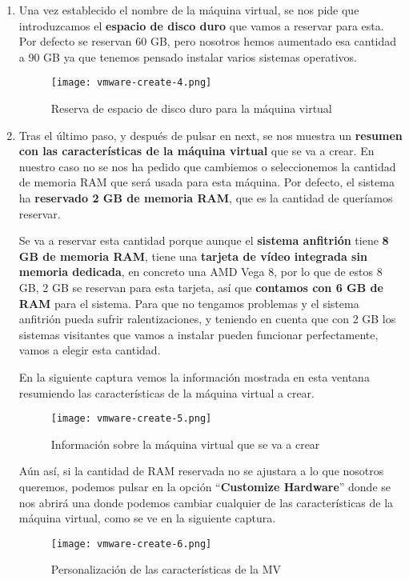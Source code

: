 \begin{enumerate}
    \item Una vez establecido el nombre de la máquina virtual, se nos pide que introduzcamos el \textbf{espacio de disco duro} que vamos a reservar para esta. Por defecto se reservan 60 GB, pero nosotros hemos aumentado esa cantidad a 90 GB ya que tenemos pensado instalar varios sistemas operativos.

    \begin{figure}[H]
        \centering
        \texttt{[image: vmware-create-4.png]}
        \caption{Reserva de espacio de disco duro para la máquina virtual}
    \end{figure}

    \item Tras el último paso, y después de pulsar en next, se nos muestra un \textbf{resumen con las características de la máquina virtual} que se va a crear. En nuestro caso no se nos ha pedido que cambiemos o seleccionemos la cantidad de memoria RAM que será usada para esta máquina. Por defecto, el sistema ha \textbf{reservado 2 GB de memoria RAM}, que es la cantidad de queríamos reservar.

    Se va a reservar esta cantidad porque aunque el \textbf{sistema anfitrión} tiene \textbf{8 GB de memoria RAM}, tiene una \textbf{tarjeta de vídeo integrada sin memoria dedicada}, en concreto una AMD Vega 8, por lo que de estos 8 GB, 2 GB se reservan para esta tarjeta, así que \textbf{contamos con 6 GB de RAM} para el sistema. Para que no tengamos problemas y el sistema anfitrión pueda sufrir ralentizaciones, y teniendo en cuenta que con 2 GB los sistemas visitantes que vamos a instalar pueden funcionar perfectamente, vamos a elegir esta cantidad.

    En la siguiente captura vemos la información mostrada en esta ventana resumiendo las características de la máquina virtual a crear.

    \begin{figure}[H]
        \centering
        \texttt{[image: vmware-create-5.png]}
        \caption{Información sobre la máquina virtual que se va a crear}
    \end{figure}

    Aún así, si la cantidad de RAM reservada no se ajustara a lo que nosotros queremos, podemos pulsar en la opción ``\textbf{Customize Hardware}'' donde se nos abrirá una donde podemos cambiar cualquier de las características de la máquina virtual, como se ve en la siguiente captura.

    \begin{figure}[H]
        \centering
        \texttt{[image: vmware-create-6.png]}
        \caption{Personalización de las características de la MV}
    \end{figure}


\end{enumerate}
